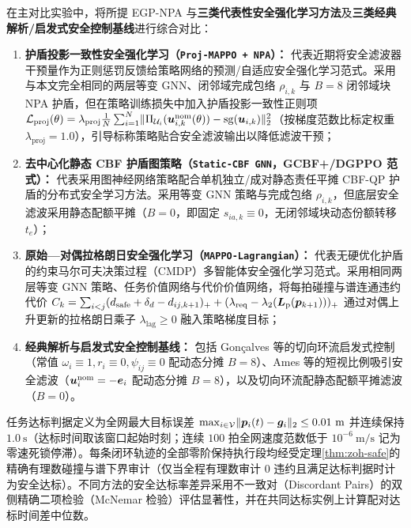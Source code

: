在主对比实验中，将所提 EGP-NPA 与\textbf{三类代表性安全强化学习方法}及\textbf{三类经典解析/启发式安全控制基线}进行综合对比：
\begin{enumerate}
 \item \textbf{护盾投影一致性安全强化学习（\texttt{Proj-MAPPO + NPA}\cite{wabersich2021,liu2026saferl}）：} 代表近期将安全滤波器干预量作为正则惩罚反馈给策略网络的预测/自适应安全强化学习范式。采用与本文完全相同的两层等变 GNN、闭邻域完成包络 $\rho_{i,k}$ 与 $B=8$ 闭邻域块 NPA 护盾，但在策略训练损失中加入护盾投影一致性正则项 $\mathcal L_{\mathrm{proj}}(\theta)=\lambda_{\mathrm{proj}}\frac1N\sum_{i=1}^N\lVert\Pi_{\mathcal U_i}(\boldsymbol{u}_{i,k}^{\mathrm{nom}}(\theta))-\operatorname{sg}(\boldsymbol{u}_{i,k})\rVert_2^2$（按梯度范数比标定权重 $\lambda_{\mathrm{proj}}=1.0$），引导标称策略贴合安全滤波输出以降低滤波干预；
 \item \textbf{去中心化静态 CBF 护盾图策略（\texttt{Static-CBF GNN}，GCBF+/DGPPO 范式\cite{zhang2025gcbf,zhang2025dgppo}）：} 代表采用图神经网络策略配合单机独立/成对静态责任平摊 CBF-QP 护盾的分布式安全学习方法。采用等变 GNN 策略与完成包络 $\rho_{i,k}$，但底层安全滤波采用静态配额平摊（$B=0$，即固定 $s_{ia,k}\equiv 0$，无闭邻域块动态份额转移 $t_e$）；
 \item \textbf{原始—对偶拉格朗日安全强化学习（\texttt{MAPPO-Lagrangian}\cite{gu2023safe}）：} 代表无硬优化护盾的约束马尔可夫决策过程（CMDP）多智能体安全强化学习范式。采用相同两层等变 GNN 策略、任务价值网络与代价价值网络，将每拍碰撞与谱连通违约代价 $C_k=\sum_{i<j}(d_{\mathrm{safe}}+\delta_d-d_{ij,k+1})_++(\lambda_{\mathrm{req}}-\lambda_2(\boldsymbol{L}_{\mathrm{p}}(\boldsymbol{p}_{k+1})))_+$ 通过对偶上升更新的拉格朗日乘子 $\lambda_{\mathrm{lag}}\ge 0$ 融入策略梯度目标；
 \item \textbf{经典解析与启发式安全控制基线：} 包括 Gon\c{c}alves 等\cite{goncalves2023circulation}的切向环流启发式控制（常值 $\omega_i\equiv 1,r_i\equiv 0,\psi_{ij}\equiv 0$ 配动态分摊 $B=8$）、Ames 等\cite{ames2017cbf,reis2021}的短视比例吸引安全滤波（$\boldsymbol{u}_i^{\mathrm{nom}}=-\boldsymbol{e}_i$ 配动态分摊 $B=8$），以及切向环流配静态配额平摊滤波（$B=0$）。
\end{enumerate}
任务达标判据定义为全网最大目标误差 $\max_{i\in\mathcal V}\lVert\boldsymbol{p}_i(t)-\boldsymbol{g}_i\rVert_2\le 0.01\ \mathrm m$ 并连续保持 $1.0\ \mathrm s$（达标时间取该窗口起始时刻；连续 $100$ 拍全网速度范数低于 $10^{-6}\ \mathrm{m/s}$ 记为零速死锁停滞）。每条闭环轨迹的全部零阶保持执行段均经受定理\ref{thm:zoh-safe}的精确有理数碰撞与谱下界审计（仅当全程有理数审计 $0$ 违约且满足达标判据时计为安全达标）。不同方法的安全达标率差异采用不一致对（Discordant Pairs）的双侧精确二项检验（McNemar 检验）评估显著性，并在共同达标实例上计算配对达标时间差中位数。

